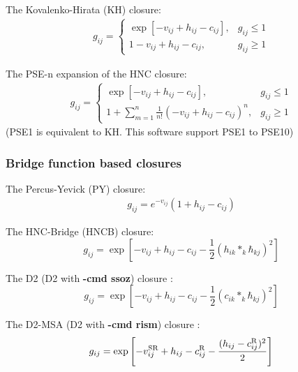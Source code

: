 \documentclass[aip,amsmath,amssymb,reprint,onecolumn]{revtex4-1}
\begin{document}
The Kovalenko-Hirata (KH) closure:
\begin{equation}\begin{split}\label{eq:KH}
    g_{ij} = \begin{cases}
        \exp\left[-v_{ij}+h_{ij}-c_{ij}\right], &g_{ij}\le 1\\
        1-v_{ij}+h_{ij}-c_{ij}, &g_{ij}\ge 1
    \end{cases}
\end{split}\end{equation}

The PSE-n expansion of the HNC closure:
\begin{equation}\begin{split}\label{eq:PSEn}
    g_{ij} = \begin{cases}
        \exp\left[-v_{ij}+h_{ij}-c_{ij}\right], &g_{ij}\le 1\\
        1+\sum_{m=1}^n\frac{1}{n!}(-v_{ij}+h_{ij}-c_{ij})^n, &g_{ij}\ge 1
    \end{cases}
\end{split}\end{equation}
(PSE1 is equivalent to KH. This software support PSE1 to PSE10)

\subsubsection{Bridge function based closures}

The Percus-Yevick (PY) closure:
\begin{equation}\begin{split}\label{eq:PY}
    g_{ij} = e^{-v_{ij}}\left(1 + h_{ij}-c_{ij}\right)
\end{split}\end{equation}

The HNC-Bridge (HNCB) closure:
\begin{equation}\label{eq:HNCB}
    g_{ij} = \exp\left[ -v_{ij} + h_{ij} - c_{ij} - \frac{1}{2}\left(h_{ik}*_k\hbar_{kj}\right)^2\right]
\end{equation}

The D2 (D2 with {\bf -cmd ssoz}) closure \cite{Cao_Xuhu_JCP_2015, Cao_Huang_AdTS_2019}:
\begin{equation}\label{eq:HNCB}
    g_{ij} = \exp\left[ -v_{ij} + h_{ij} - c_{ij} - \frac{1}{2}\left(c_{ik}*_k\hbar_{kj}\right)^2\right]
\end{equation}

The D2-MSA (D2 with {\bf -cmd rism}) closure \cite{Cao_Xuhu_MP_2018, Cao_Huang_AdTS_2019}:
\begin{equation}\label{eq:D2MSA}
    g_{ij} = \exp\left[ -v^{\rm SR}_{ij} + h_{ij} - c^{\rm R}_{ij} - \frac{(h_{ij} - c^{\rm R}_{ij})^2}{2}\right]
\end{equation}
\end{document}
